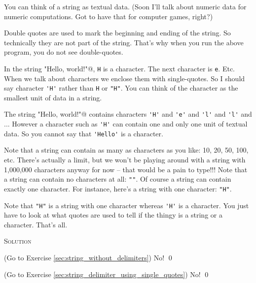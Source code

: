 You can think of a string as textual data. 
(Soon I'll talk about numeric data for numeric computations. 
Got to have that for computer games, right?)

Double quotes are used to mark the beginning and ending of the string. 
So technically they are not part of the string. 
That's why when you run the above program, you do not see double-quotes.



In the string 
\verb@"Hello, world!\n"@, 
\verb!H! is a character. 
The next character is \verb!e!. Etc. 
When we talk about characters we enclose them with single-quotes. 
So I should say character \verb!'H'! rather than 
\verb!H! or \verb!"H"!. 
You can think of the character as the smallest unit of data in a string. 

The string \verb@"Hello, world!\n"@ contains characters 
\verb!'H'! and \verb!'e'! and \verb!'l'! and \verb!'l'! and 
... 
However a character such as 
\verb!'H'! can contain one and only one unit of textual data. 
So you cannot say that \verb!'Hello'! is a character. 

Note that a string can contain as many as characters as you like: 
10, 20, 50, 100, etc. 
There's actually a limit, but we won't be playing around with a string with 
1,000,000 characters anyway for now --
that would be a pain to type!!! 
Note that a string can contain no characters at all: 
\verb!""!. 
Of course a string can contain exactly one character. 
For instance, here's a string with one character: \verb!"H"!. 

Note that \verb!"H"! is a string with one character whereas 
\verb!'H'! is a character. 
You just have to look at what quotes are used to tell if the thingy is a 
string or a character. That's all.








\newpage
\textsc{Solution}

\begin{soln} \label{sec:string_without_delimiters_soln}
(Go to Exercise \ref{sec:string_without_delimiters})
No!
\qed
\end{soln}

\begin{soln} \label{sec:string_delimiter_using_single_quotes_soln}
(Go to Exercise \ref{sec:string_delimiter_using_single_quotes})
No!
\qed
\end{soln}

